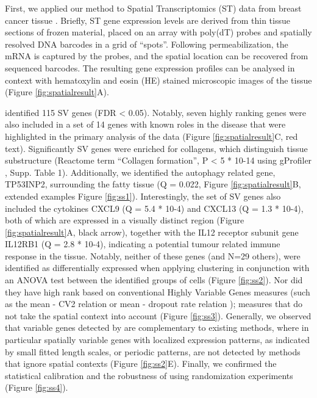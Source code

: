 First, we applied our method to Spatial Transcriptomics (ST) data from breast cancer tissue \cite{Stahl2016-ym}. Briefly, ST gene expression levels are derived from thin tissue sections of frozen material, placed on an array with poly(dT) probes and spatially resolved DNA barcodes in a grid of “spots”. Following permeabilization, the mRNA is captured by the probes, and the spatial location can be recovered from sequenced barcodes. The resulting gene expression profiles can be analysed in context with hematoxylin and eosin (HE) stained microscopic images of the tissue (Figure \ref{fig:spatialresult}A).

 identified 115 SV genes (FDR < 0.05). Notably, seven highly ranking genes were also included in a set of 14 genes with known roles in the disease that were highlighted in the primary analysis of the data (Figure \ref{fig:spatialresult}C, red text). Significantly SV genes were enriched for collagens, which distinguish tissue substructure \cite{Seewaldt2012-lk} (Reactome term “Collagen formation”, P < 5 * 10-14 using gProfiler \cite{Reimand2016-nz}, Supp. Table 1). Additionally, we identified the autophagy related gene, TP53INP2, surrounding the fatty tissue (Q = 0.022, Figure \ref{fig:spatialresult}B, extended examples Figure \ref{fig:ss1}). Interestingly, the set of SV genes also included the cytokines CXCL9 (Q = 5.4 * 10-4) and CXCL13 (Q = 1.3 * 10-4), both of which are expressed in a visually distinct region (Figure \ref{fig:spatialresult}A, black arrow), together with the IL12 receptor subunit gene IL12RB1 (Q = 2.8 * 10-4), indicating a potential tumour related immune response in the tissue. Notably, neither of these genes (and N=29 others), were identified as differentially expressed when applying clustering in conjunction with an ANOVA test between the identified groups of cells (Figure \ref{fig:ss2}). Nor did they have high rank based on conventional Highly Variable Genes measures (such as the mean - CV2 relation \cite{Brennecke2013-vv} or mean - dropout rate relation \cite{Andrews2016-ky}); measures that do not take the spatial context into account (Figure \ref{fig:ss3}). Generally, we observed that variable genes detected by  are complementary to existing methods, where in particular spatially variable genes with localized expression patterns, as indicated by small fitted length scales, or periodic patterns, are not detected by methods that ignore spatial contexts (Figure \ref{fig:ss2}E). Finally, we confirmed the statistical calibration and the robustness of  using randomization experiments (Figure \ref{fig:ss4}).

